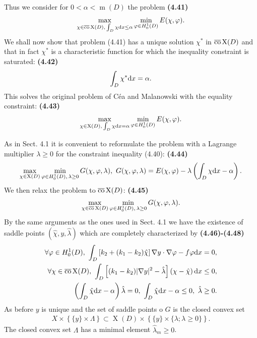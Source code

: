 \documentclass{book}
\numberwithin{equation}{section}
\begin{document}
\begin{enumerate}
    Thus we consider for $0 < \alpha < \operatorname{m}(D)$ the problem \textbf{(4.41)}
    \begin{align*}
        \max_{\chi\in\overline{\rm co}\operatorname{X}(D),\,\int_D \chi{\rm d}x\le\alpha} \min_{\varphi\in H_0^1(D)} E(\chi,\varphi).
    \end{align*}
    We shall now show that problem (4.41) has a unique solution $\chi^*$ in $\overline{\rm co}\operatorname{X}(D)$ and that in fact $\chi^*$ is a characteristic function for which the inequality constraint is saturated: \textbf{(4.42)}
    \begin{align*}
        \int_D \chi^*{\rm d}x = \alpha.
    \end{align*}
    This solves the original problem of Céa and Malanowski with the equality constraint: \textbf{(4.43)}
    \begin{align*}
        \max_{\chi\in\operatorname{X}(D),\,\int_D \chi{\rm d}x = \alpha} \min_{\varphi\in H_0^1(D)} E(\chi,\varphi).
    \end{align*}
    
    As in Sect. 4.1 it is convenient to reformulate the problem with a Lagrange multiplier $\lambda\ge 0$ for the constraint inequality (4.40): \textbf{(4.44)}
    \begin{align*}
        \max_{\chi\in\operatorname{X}(D)} \min_{\varphi\in H_0^1(D),\,\lambda\ge 0} G(\chi,\varphi,\lambda),\ G(\chi,\varphi,\lambda) = E(\chi,\varphi) - \lambda\left(\int_D \chi{\rm d}x - \alpha\right).
    \end{align*}
    We then relax the problem to $\overline{\rm co}\operatorname{X}(D)$: \textbf{(4.45)}
    \begin{align*}
        \max_{\chi\in\overline{\rm co}\operatorname{X}(D)} \min_{\varphi\in H_0^1(D),\,\lambda\ge 0} G(\chi,\varphi,\lambda).
    \end{align*}
    By the same arguments as the ones used in Sect. 4.1 we have the existence of saddle points $(\hat{\chi},y,\hat{\lambda})$ which are completely characterized by \textbf{(4.46)-(4.48)}
    \begin{align*}
        \forall\varphi\in H_0^1(D),\ \int_D \left[k_2 + (k_1 - k_2)\hat{\chi}\right]\nabla y\cdot\nabla\varphi - f\varphi{\rm d}x &= 0,\\
        \forall\chi\in\overline{\rm co}\operatorname{X}(D),\ \int_D \left[(k_1 - k_2)|\nabla y|^2 - \hat{\lambda}\right]\left(\chi - \hat{\chi}\right){\rm d}x&\le 0,\\
        \left(\int_D \hat{\chi}{\rm d}x - \alpha\right)\hat{\lambda} = 0,\ \int_D \hat{\chi}{\rm d}x - \alpha\le 0,\ \hat{\lambda}&\ge 0.
    \end{align*}
    As before $y$ is unique and the set of saddle points o $G$ is the closed convex set
    \begin{align*}
        X\times\left\{\{y\}\times\Lambda\right\}\subset\operatorname{X}(D)\times\left\{\{y\}\times\{\lambda;\lambda\ge 0\}\right\}.
    \end{align*}
    The closed convex set $\Lambda$ has a minimal element $\hat{\lambda}_m\ge 0$.
    

\end{enumerate}
\end{document}
